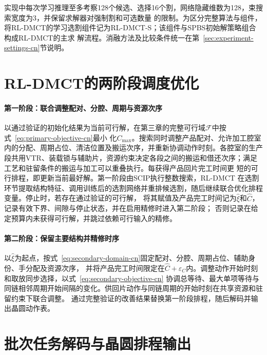 实现中每次学习推理至多考察128个候选、选择16个割，网络隐藏维数为128，束搜索宽度为3，并保留求解器对强制割和可选数量
的限制。为区分完整算法与组件，将RL-DMCT的学习选割组件记为RL-DMCT-S；该组件与SPBS初始解策略组合构成RL-DMCT的主求
解流程。消融方法及比较条件统一在第~\ref{sec:experiment-settings-cn}节说明。

\section{RL-DMCT的两阶段调度优化}

\paragraph{第一阶段：联合调整配对、分腔、周期与资源次序}
以通过验证的初始化结果为当前可行解，在第三章的完整可行域$\mathcal F$中按式~\eqref{eq:primary-objective-cn}最小
化$C_{\max}$。搜索同时调整产品配对、允许加工腔室内的分配、周期占位、清洁位置及搬运次序，并重新协调动作时刻。各腔室的生产
段共用VTR、装载锁与辅助片，资源约束决定各段之间的搬运和借还次序；满足工艺和驻留条件的搬运与加工可以重叠执行。每获得产品回片完工时间更
短的可行排程，即更新当前最好解。第一阶段由SCIP执行整数搜索\citep{achterberg2009scip,bestuzheva2023scip}，RL-DMCT
在选割环节提取结构特征、调用训练后的选割网络并重排候选割，随后继续联合优化排程变量。停止时，若存在通过验证的可行解，
将其赋值及产品完工时间记为$\widehat\xi$和$\widehat C$，记录有效下界、间隙与停止状态，并在启用精修时进入第二阶段；
否则记录在给定预算内未获得可行解，并跳过依赖可行输入的精修。

\paragraph{第二阶段：保留主要结构并精修时序}
以$\widehat\xi$为起点，按式~\eqref{eq:secondary-domain-cn}固定配对、分腔、周期占位、辅助身份、手分配及资源次序，
并将产品完工时间限定在$\widehat C+\varepsilon_C$内。调整动作开始时刻和取放同步选择，以式~\eqref{eq:secondary-objective-cn}
协调总等待、最大单项等待与同链相邻周期开始间隔的变化。供回片动作与同链周期的开始时刻在共享资源和驻留约束下联合调整。
通过完整验证的改善结果替换第一阶段排程，随后解码并输出晶圆动作表。

\section{批次任务解码与晶圆排程输出}
\label{sec:pjob-decoding-cn}

